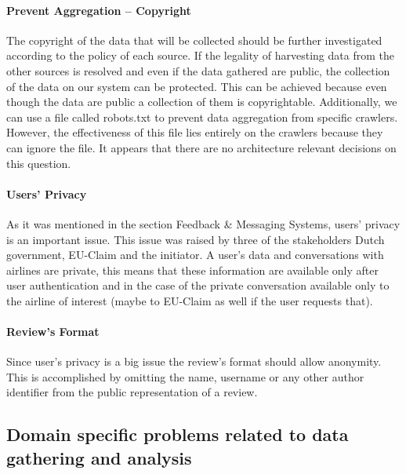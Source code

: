 \paragraph{Prevent Aggregation – Copyright} The copyright of the data that will be collected should be further investigated according to the policy of each source. If the legality of 
harvesting data from the other sources is resolved and even if the data gathered are public, the collection of the data on our system can be protected. This can be achieved because 
even though the data are public a collection of them is copyrightable. Additionally, we can use a file called robots.txt to prevent data aggregation from specific crawlers. However, 
the effectiveness of this file lies entirely on the crawlers because they can ignore the file. It appears that there are no architecture relevant decisions on this question.

\paragraph{Users' Privacy} As it was mentioned in the section Feedback \& Messaging Systems, users' privacy is an important issue. This issue was raised by three of the stakeholders 
Dutch government, EU-Claim and the initiator. A user's data and conversations with airlines are private, this means that these information are available only after user authentication 
and in the case of the private conversation available only to the airline of interest (maybe to EU-Claim as well if the user requests that). 

\paragraph{Review's Format} Since user's privacy is a big issue the review's format should allow anonymity. This is accomplished by omitting the name, username or any other author 
identifier from the public representation of a review.

\subsection{Domain specific problems related to data gathering and analysis}
